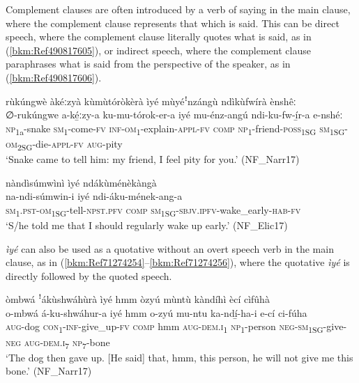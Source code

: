 Complement clauses are often introduced by a verb of saying in the main clause, where the complement clause represents that which is said. This can be direct speech, where the complement clause literally quotes what is said, as in (\ref{bkm:Ref490817605}), or indirect speech, where the complement clause paraphrases what is said from the perspective of the speaker, as in (\ref{bkm:Ref490817606}).

\ea
\label{bkm:Ref490817605}
rùkúngwè àkéːzyà kùmùtóròkèrà ìyé mùyéꜝnzángù ndìkùfwírà ènshêː\\
\gll ∅-rukúngwe  a-ké̲ːzy-a  ku-mu-tórok-er-a    iyé mu-énz-angú  ndi-ku-fw-í̲r-a    e-nshéː\\
\textsc{np}\textsubscript{1a}-snake  \textsc{sm}\textsubscript{1}-come-\textsc{fv}  \textsc{inf}-\textsc{om}\textsubscript{1}-explain-\textsc{appl}-\textsc{fv}  \textsc{comp}
\textsc{np}\textsubscript{1}-friend-\textsc{poss}\textsubscript{1SG}  \textsc{sm}\textsubscript{1SG}-\textsc{om}\textsubscript{2SG}-die-\textsc{appl}-\textsc{fv}  \textsc{aug}-pity\\
\glt ‘Snake came to tell him: my friend, I feel pity for you.’ (NF\_Narr17)
\z

\ea
\label{bkm:Ref490817606}
nàndìsúmwìnì ìyé ndákùménèkàngà\\
\gll na-ndi-súmwin-i      iyé  ndi-áku-mének-ang-a\\
\textsc{sm}\textsubscript{1}.\textsc{pst}-\textsc{om}\textsubscript{1SG}-tell-\textsc{npst}.\textsc{pfv}  \textsc{comp}  \textsc{sm}\textsubscript{1SG}-\textsc{sbjv}.\textsc{ipfv}-wake\_early-\textsc{hab}-\textsc{fv}\\
\glt ‘S/he told me that I should regularly wake up early.’ (NF\_Elic17)
\z

\textit{ìyé} can also be used as a quotative without an overt speech verb in the main clause, as in (\ref{bkm:Ref71274254}--\ref{bkm:Ref71274256}), where the quotative \textit{ìyé} is directly followed by the quoted speech.

\ea
\label{bkm:Ref71274254}
òmbwá ꜝákùshwáhùrà ìyé hmm òzyú mùntù kàndíhì ècí cìfûhà\\
\gll o-mbwá  á-ku-shwáhur-a    iyé  hmm  o-zyú    mu-ntu ka-ndí̲-ha-i      e-cí    ci-fúha\\
\textsc{aug}-dog  \textsc{con}\textsubscript{1}-\textsc{inf}-give\_up-\textsc{fv}  \textsc{comp}  hmm  \textsc{aug}-\textsc{dem}.\textsc{i}\textsubscript{1}  \textsc{np}\textsubscript{1}-person
\textsc{neg}-\textsc{sm}\textsubscript{1SG}-give-\textsc{neg}  \textsc{aug}-\textsc{dem}.\textsc{i}\textsubscript{7}  \textsc{np}\textsubscript{7}-bone\\
\glt ‘The dog then gave up. [He said] that, hmm, this person, he will not give me this bone.’ (NF\_Narr17)
\z

